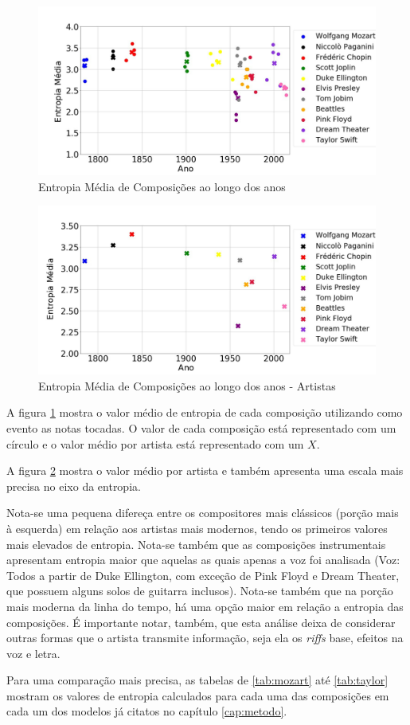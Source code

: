 \begin{figure}[h]
\centering
\includegraphics[width=\textwidth]{Cap3/evo.jpg}
\caption{Entropia Média de Composições ao longo dos anos}
\label{fig:evo}
\end{figure}

\begin{figure}[h]
\centering
\includegraphics[width=\textwidth]{Cap3/marks2.jpg}
\caption{Entropia Média de Composições ao longo dos anos - Artistas}
\label{fig:artists}
\end{figure}
A figura \ref{fig:evo} mostra o valor médio de entropia de cada composição utilizando como evento as notas tocadas. O valor de cada composição está representado com um círculo e o valor médio por artista está representado com um $X$. 

A figura \ref{fig:artists} mostra o valor médio por artista e também apresenta uma escala mais precisa no eixo da entropia.

Nota-se uma pequena difereça entre os compositores mais clássicos (porção mais à esquerda) em relação aos artistas mais modernos, tendo os primeiros valores mais elevados de entropia. Nota-se também que as composições instrumentais apresentam entropia maior que aquelas as quais apenas a voz foi analisada (Voz: Todos a partir de Duke Ellington, com exceção de Pink Floyd e Dream Theater, que possuem alguns solos de guitarra inclusos). Nota-se também que na porção mais moderna da linha do tempo, há uma opção maior em relação a entropia das composições. É importante notar, também, que esta análise deixa de considerar outras formas que o artista transmite informação, seja ela os \textit{riffs} base, efeitos na voz e letra.

Para uma comparação mais precisa, as tabelas de \ref{tab:mozart} até \ref{tab:taylor} mostram os valores de entropia calculados para cada uma das composições em cada um dos modelos já citatos no capítulo \ref{cap:metodo}.
